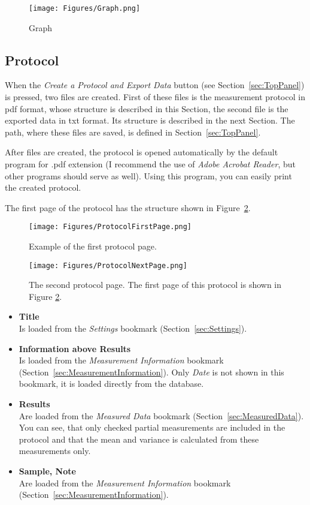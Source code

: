 \documentclass[a4paper,11pt,twoside]{book}
\theoremstyle{named}
\begin{document}
\begin{figure}[t]
  \centering
  \texttt{[image: Figures/Graph.png]}
  \caption{Graph}
  \label{fig:Graph}
\end{figure}

\subsection{Protocol}
\label{sec:Protocol}

When the \textit{Create a Protocol and Export Data} button (see
Section~\ref{sec:TopPanel}) is pressed, two files are created. First of these
files is the measurement protocol in pdf format, whose structure is described in
this Section, the second file is the exported data in txt format. Its structure
is described in the next Section. The path, where these files are saved, is
defined in Section~\ref{sec:TopPanel}. 

After files are created, the protocol is opened automatically by the default
program for .pdf extension (I recommend the use of \textit{Adobe Acrobat
Reader}, but other programs should serve as well). Using this program, you can
easily print the created protocol. 

The first page of the protocol has the structure shown in
Figure~\ref{fig:ProtocolFirstPage}. 

\begin{figure}[t]
  \centering
  \texttt{[image: Figures/ProtocolFirstPage.png]}
  \caption{Example of the first protocol page.}
  \label{fig:ProtocolFirstPage}
\end{figure}

\begin{figure}[p]
  \centering
  \texttt{[image: Figures/ProtocolNextPage.png]}
  \caption{The second protocol page. The first page of this protocol is shown
    in Figure \ref{fig:ProtocolFirstPage}.}
  \label{fig:ProtocolNextPage}
\end{figure}

\begin{itemize}
  \item \textbf{Title} \\
    Is loaded from the \textit{Settings} bookmark (Section~\ref{sec:Settings}).
  \item \textbf{Information above Results} \\
    Is loaded from the \textit{Measurement Information} bookmark
    (Section~\ref{sec:MeasurementInformation}). Only \textit{Date} is not shown
    in this bookmark, it is loaded directly from the database.
  \item \textbf{Results} \\
    Are loaded from the \textit{Measured Data} bookmark
    (Section~\ref{sec:MeasuredData}). You can see, that only checked partial
    measurements are included in the protocol and that the mean and variance is
    calculated from these measurements only. 
  \item \textbf{Sample, Note} \\
    Are loaded from the \textit{Measurement Information} bookmark
    (Section~\ref{sec:MeasurementInformation}).
\end{itemize}
\end{document}

